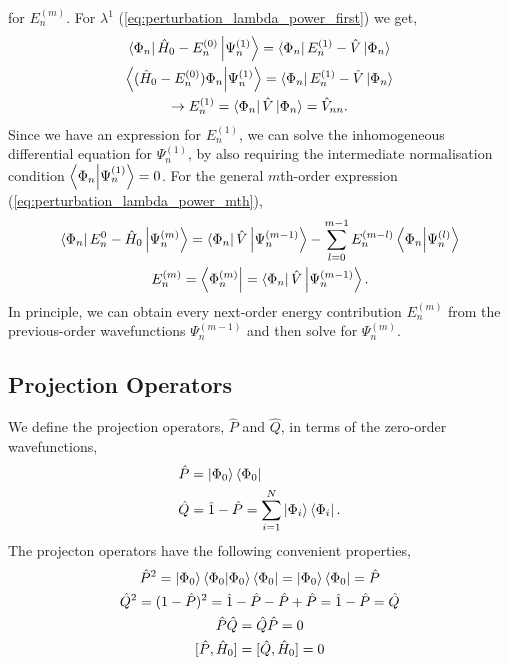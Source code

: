 for $E_n^{(m)}$. 
For $\lambda^1$ (\autoref{eq:perturbation_lambda_power_first}) we get,
\begin{equation}
    \begin{gathered}
    \bra{\Phi_n} \hat{H}_0 - E_n^{(0)}\ket{\Psi_n^{(1)}}
        = \bra{\Phi_n} E_n^{(1)} - \hat{V}\ket{\Phi_n} \\
    \bra{(\hat{H}_0 - E_n^{(0)})\Phi_n} \ket{\Psi_n^{(1)}}
        = \bra{\Phi_n} E_n^{(1)} - \hat{V}\ket{\Phi_n} \\
    \to E_n^{(1)} = \bra{\Phi_n} \hat{V} \ket{\Phi_n} = \hat{V}_{nn}.
    \end{gathered}
\end{equation}
Since we have an expression for $E_n^{(1)}$, we can solve the inhomogeneous 
differential equation for $\Psi_n^{(1)}$, by also requiring the intermediate
normalisation condition $\braket{\Phi_n}{\Psi_n^{(1)}} = 0$. For 
the general $m$th-order expression (\autoref{eq:perturbation_lambda_power_mth}),
\begin{equation}
    \begin{gathered}
        \bra{\Phi_n} E_n^{0} - \hat{H}_0\ket{\Psi_n^{(m)}}
            = \bra{\Phi_n} \hat{V} \ket{\Psi_n^{(m-1)}}
            - \sum_{l=0}^{m-1}E_n^{(m-l)}\braket{\Phi_n}{\Psi_n^{(l)}} \\
        E_n^{(m)} = \bra{\Phi_n^{(m)}} = \bra{\Phi_n} \hat{V} \ket{\Psi_n^{(m-1)}}.
    \end{gathered}
\end{equation} 
In principle, we can obtain every next-order energy contribution $E_n^{(m)}$ from 
the previous-order wavefunctions $\Psi_n^{(m-1)}$ and then solve for $\Psi_n^{(m)}$.

\subsection{Projection Operators}
We define the projection operators, $\hat{P}$ and $\hat{Q}$, in terms of the
zero-order wavefunctions,
\begin{equation}
    \begin{aligned}
        \hat{P} &= \ket{\Phi_0} \bra{\Phi_0} \\
        \hat{Q} &= \hat{1} - \hat{P} = \sum_{i=1}^N \ket{\Phi_i} \bra{\Phi_i}.
    \end{aligned}
\end{equation}
The projecton operators have the following convenient properties,
\begin{equation}
    \begin{gathered}
    \hat{P}^2 =  \ket{\Phi_0}\bra{\Phi_0}\ket{\Phi_0}\bra{\Phi_0} 
        = \ket{\Phi_0}\bra{\Phi_0} = \hat{P} \\
    \hat{Q}^2 = (1 - \hat{P})^2 = \hat{1} - \hat{P} - \hat{P} + \hat{P}
        = \hat{1} - \hat{P} = \hat{Q} \\
    \hat{P}\hat{Q} = \hat{Q} \hat{P} = 0 \\
    [ \hat{P}, \hat{H}_0 ] = [ \hat{Q}, \hat{H}_0 ] = 0
    \end{gathered}
\end{equation}


